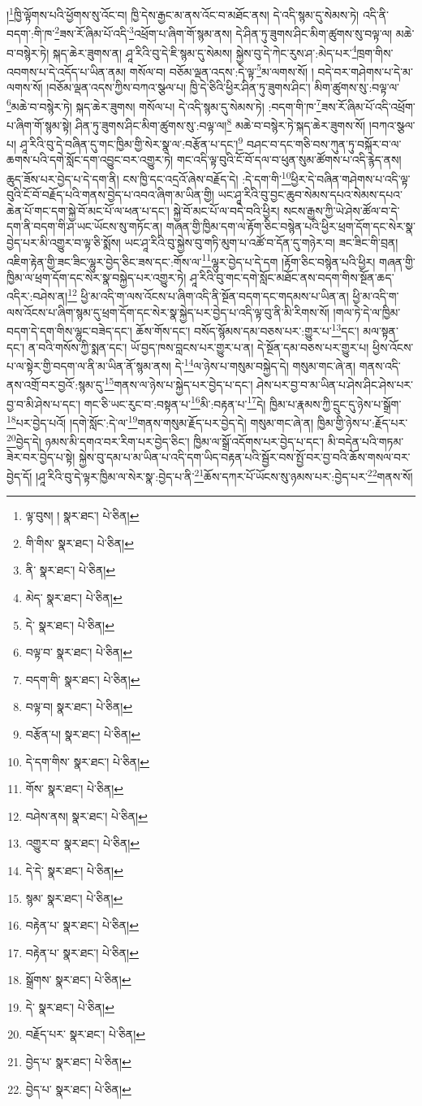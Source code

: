 །\footnote{ལྟ་བུས། །  སྣར་ཐང་།  པེ་ཅིན། }ཁྱི་ལྟོགས་པའི་ཕྱོགས་སུ་འོང་བ། ཁྱི་དེས་རྒྱང་མ་ནས་འོང་བ་མཐོང་ནས། དེ་འདི་སྙམ་དུ་སེམས་ཏེ། འདི་ནི་བདག་:གི་ཁ་\footnote{གི་གིས་  སྣར་ཐང་།  པེ་ཅིན། }ཟས་རོ་ཞིམ་པོ་འདི་\footnote{ནི་  སྣར་ཐང་།  པེ་ཅིན། }འཕྲོག་པ་ཞིག་གོ་སྙམ་ནས། དེ་ཤིན་ཏུ་ཟུགས་ཤིང་མིག་ཚུགས་སུ་བལྟ་ལ། མཆེ་བ་བསྙེར་ཏེ། སྐད་ཆེར་ཟུགས་ན། ཤཱ་རིའི་བུ་དེ་ཇི་སྙམ་དུ་སེམས། སྐྱེས་བུ་དེ་ཀེང་རུས་ཤ་:མེད་པར་\footnote{མེད་  སྣར་ཐང་།  པེ་ཅིན། }ཁྲག་གིས་འབགས་པ་དེ་འདོད་པ་ཡིན་ནམ། གསོལ་བ། བཅོམ་ལྡན་འདས་:དེ་ལྟ་\footnote{དེ་  སྣར་ཐང་།  པེ་ཅིན། }མ་ལགས་སོ། །
བདེ་བར་གཤེགས་པ་དེ་མ་ལགས་སོ། །བཅོམ་ལྡན་འདས་ཀྱིས་བཀའ་སྩལ་པ། ཁྱི་དེ་ཅིའི་ཕྱིར་ཤིན་ཏུ་ཟུགས་ཤིང་། མིག་ཚུགས་སུ་:བལྟ་ལ་\footnote{བལྟ་བ་  སྣར་ཐང་།  པེ་ཅིན། }མཆེ་བ་བསྙེར་ཏེ། སྐད་ཆེར་ཟུགས། གསོལ་པ། དེ་འདི་སྙམ་དུ་སེམས་ཏེ། :བདག་གི་ཁ་\footnote{བདག་གི་  སྣར་ཐང་།  པེ་ཅིན། }ཟས་རོ་ཞིམ་པོ་འདི་འཕྲོག་པ་ཞིག་གོ་སྙམ་སྟེ། ཤིན་ཏུ་ཟུགས་ཤིང་མིག་ཚུགས་སུ་:བལྟ་ལ།\footnote{བལྟ་བ།  སྣར་ཐང་།  པེ་ཅིན། } མཆེ་བ་བསྙེར་ཏེ་སྐད་ཆེར་ཟུགས་སོ། །བཀའ་སྩལ་པ། ཤཱ་རིའི་བུ་དེ་བཞིན་དུ་གང་ཁྱིམ་གྱི་སེར་སྣ་ལ་:བརྩོན་པ་དང་།\footnote{བརྩོན་པ།  སྣར་ཐང་།  པེ་ཅིན། } བཤང་བ་དང་གཅི་བས་ཀུན་ཏུ་བསྐོར་བ་ལ་ཆགས་པའི་དགེ་སློང་དག་འབྱུང་བར་འགྱུར་ཏེ། གང་འདི་ལྟ་བུའི་ངོ་བོ་དལ་བ་ཕུན་སུམ་ཚོགས་པ་འདི་རྙེད་ནས། ཆུད་ཟོས་པར་བྱེད་པ་དེ་དག་ནི། ངས་ཁྱི་དང་འདྲའོ་ཞེས་བརྗོད་དེ། :དེ་དག་གི་\footnote{དེ་དག་གིས་  སྣར་ཐང་།  པེ་ཅིན། }ཕྱིར་དེ་བཞིན་གཤེགས་པ་འདི་ལྟ་བུའི་ངོ་བོ་བརྗོད་པའི་གནས་བྱེད་པ་འབའ་ཞིག་མ་ཡིན་གྱི། ཡང་ཤཱ་རིའི་བུ་བྱང་ཆུབ་སེམས་དཔའ་སེམས་དཔའ་ཆེན་པོ་གང་དག་སྐྱེ་བོ་མང་པོ་ལ་ཕན་པ་དང་། སྐྱེ་བོ་མང་པོ་ལ་བདེ་བའི་ཕྱིར། སངས་རྒྱས་ཀྱི་ཡེ་ཤེས་ཚོལ་བ་དེ་དག་ནི་བདག་གི་ཤ་ཡང་ཡོངས་སུ་གཏོང་ན། གཞན་གྱི་ཁྱིམ་དག་ལ་རྟོག་ཅིང་བསྙེན་པའི་ཕྱིར་ཕྲག་དོག་དང་སེར་སྣ་བྱེད་པར་མི་འགྱུར་བ་ལྟ་ཅི་སྨོས། ཡང་ཤཱ་རིའི་བུ་སྐྱེས་བུ་གཏི་མུག་པ་འཚོ་བ་དོན་དུ་གཉེར་བ། ཟང་ཟིང་གི་བྲན། འཇིག་རྟེན་གྱི་ཟང་ཟིང་ལྷུར་བྱེད་ཅིང་ཟས་དང་:གོས་ལ་\footnote{གོས་  སྣར་ཐང་།  པེ་ཅིན། }ལྷུར་བྱེད་པ་དེ་དག །རྟོག་ཅིང་བསྙེན་པའི་ཕྱིར། གཞན་གྱི་ཁྱིམ་ལ་ཕྲག་དོག་དང་སེར་སྣ་བསྐྱེད་པར་འགྱུར་ཏེ། ཤཱ་རིའི་བུ་གང་དགེ་སློང་མཐོང་ནས་བདག་གིས་སྔོན་ཆད་འདིར་:བཤེས་ན།\footnote{བཤེས་ནས།  སྣར་ཐང་།  པེ་ཅིན། } ཕྱི་མ་འདི་ག་ལས་འོངས་པ་ཞིག་འདི་ནི་སྔོན་བདག་དང་གདམས་པ་ཡིན་ན། ཕྱི་མ་འདི་ག་ལས་འོངས་པ་ཞིག་སྙམ་དུ་ཕྲག་དོག་དང་སེར་སྣ་སྐྱེད་པར་བྱེད་པ་འདི་ལྟ་བུ་ནི་མི་རིགས་སོ། །གལ་ཏེ་དེ་ལ་ཁྱིམ་བདག་དེ་དག་གིས་ལྷུང་བཟེད་དང་། ཆོས་གོས་དང་། བསོད་སྙོམས་དམ་བཅས་པར་:གྱུར་པ་\footnote{འགྱུར་བ་  སྣར་ཐང་།  པེ་ཅིན། }དང་། མལ་སྟན་དང་། ན་བའི་གསོས་ཀྱི་སྨན་དང་། ཡོ་བྱད་ཁས་བླངས་པར་གྱུར་པ་ན། དེ་སྔོན་དམ་བཅས་པར་གྱུར་པ། ཕྱིས་འོངས་པ་ལ་སྟེར་གྱི་བདག་ལ་ནི་མ་ཡིན་ནོ་སྙམ་ནས། དེ་\footnote{དེ་དེ་  སྣར་ཐང་།  པེ་ཅིན། }ལ་ཉེས་པ་གསུམ་བསྐྱེད་དེ། གསུམ་གང་ཞེ་ན། གནས་འདི་ནས་འགྲོ་བར་བྱའོ་:སྙམ་དུ་\footnote{སྙམ་  སྣར་ཐང་།  པེ་ཅིན། }གནས་ལ་ཉེས་པ་སྐྱེད་པར་བྱེད་པ་དང་། ཤེས་པར་བྱ་བ་མ་ཡིན་པ་ཤེས་ཤིང་ཤེས་པར་བྱ་བ་མི་ཤེས་པ་དང་། གང་ཅི་ཡང་རུང་བ་:བསྟན་པ་\footnote{བརྟེན་པ་  སྣར་ཐང་།  པེ་ཅིན། }མི་:བརྟན་པ་\footnote{བརྟེན་པ་  སྣར་ཐང་།  པེ་ཅིན། }དེ། ཁྱིམ་པ་རྣམས་ཀྱི་དྲུང་དུ་ཉེས་པ་སྒྲོག་\footnote{སྒྲོགས་  སྣར་ཐང་།  པེ་ཅིན། }པར་བྱེད་པའོ། །དགེ་སློང་:དེ་ལ་\footnote{དེ་  སྣར་ཐང་།  པེ་ཅིན། }གནས་གསུམ་རྗོད་པར་བྱེད་དེ། གསུམ་གང་ཞེ་ན། ཁྱིམ་གྱི་ཉེས་པ་:རྗོད་པར་\footnote{བརྗོད་པར་  སྣར་ཐང་།  པེ་ཅིན། }བྱེད་དེ། ཉམས་མི་དགའ་བར་རིག་པར་བྱེད་ཅིང་། ཁྱིམ་ལ་སྒྲོ་འདོགས་པར་བྱེད་པ་དང་། མི་བདེན་པའི་གཏམ་ཟེར་བར་བྱེད་པ་སྟེ། སྐྱེས་བུ་དམ་པ་མ་ཡིན་པ་འདི་དག་ཡིད་བརྟན་པའི་སྦྱོར་བས་སྤྱོ་བར་བྱ་བའི་ཆོས་གསལ་བར་བྱེད་དོ། །ཤཱ་རིའི་བུ་དེ་ལྟར་ཁྱིམ་ལ་སེར་སྣ་:བྱེད་པ་ནི་\footnote{བྱེད་པ་  སྣར་ཐང་།  པེ་ཅིན། }ཆོས་དཀར་པོ་ཡོངས་སུ་ཉམས་པར་:བྱེད་པར་\footnote{བྱེད་པ་  སྣར་ཐང་།  པེ་ཅིན། }གནས་སོ། 